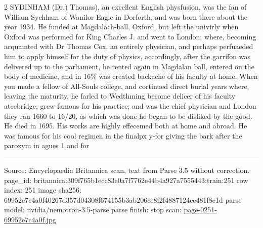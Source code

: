 \documentclass[10pt]{article}
\begin{document}
\begin{multicols}{2}
SYDINHAM (Dr.) Thomas), an excellent English physfusion, was the fan of William Sychham of Wanilor Eagle in Dorforth, and was born there about the year 1934. He funded at Magdalach-ball, Oxford, but left the univirly when Oxford was performed for King Charles J. and went to London; where, becoming acquainted with Dr Thomas Cox, an entirely physician, and perhaps perfuaeded him to apply himself for the duty of physics, accordingly, after the garrifon was delivered up to the parliament, he rented again in Magdalan ball, entered on the body of medicine, and in 16\% was created backache of his faculty at home. When you made a fellow of All-Souls college, and cortinued direct burial years where, leaving the maturity, he farled to Wedthming become delicer of his faculty atcebridge; grew famous for his practice; and was the chief physician and London they ran 1660 to 16/20, as which was done he began to be disliked by the good. He died in 1695. His works are highly effecemed both at home and abroad. He was famous for his cool regimen in the finalpx y-for giving the bark after the paroxym in agues 1 and for

\end{multicols}
\vfill\par\noindent\rule{\linewidth}{0.4pt}\par
{\scriptsize\color{gray}\noindent Source: Encyclopaedia Britannica scan, text from Parse 3.5 without correction. page\_id: britannica:309f765b1ecc83e0a7f7762e44b4a927a7555443:train:251 \quad row index: 251 \quad image sha256: 69952e7c4a0f40267d357d04308f674155b3ab206ce8f2f4887124ce481f8c1d \quad parse model: nvidia/nemotron-3.5-parse \quad parse finish: stop \quad scan: \href{../scans/page-0251-69952e7c4a0f.jpg}{page-0251-69952e7c4a0f.jpg}\par}
\end{document}
